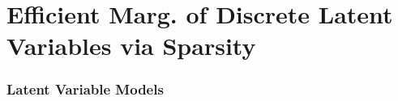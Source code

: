 \documentclass[xetex,aspectratio=169,xcolor,professionalfonts,hyperref]{beamer}
\begin{document}

\section{Efficient Marg. of Discrete Latent Variables via Sparsity}

\begin{frame}
    \frametitle{Latent Variable Models}

    \begin{itemize}
    \end{itemize}


\end{frame}
\end{document}
